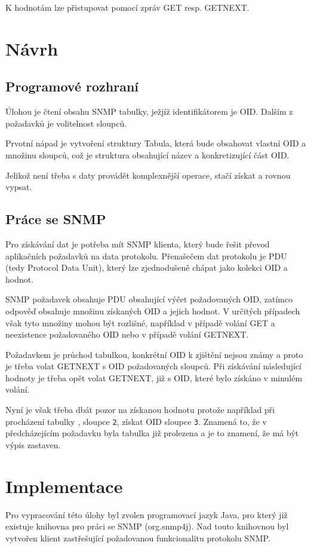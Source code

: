 \documentclass[12pt,a4paper]{article}
\let\oldsection\section
\renewcommand\section{\clearpage\oldsection}
\begin{document}
K hodnotám lze přistupovat pomocí zpráv GET resp. GETNEXT.

\section{Návrh}
\subsection{Programové rozhraní}
Úlohou je čtení obsahu SNMP tabulky, ježjíž identifikátorem je OID. Dalším z požadavků je volitelnost sloupců.

Prvotní nápad je vytvoření struktury Tabula, která bude obsahovat vlastní OID a množinu sloupců, což je struktura obsahující název a konkretizující část OID.

Jelikož není třeba s daty provádět komplexnější operace, stačí získat a rovnou vypsat.

\subsection{Práce se SNMP}
Pro získávání dat je potřeba mít SNMP klienta, který bude řešit převod aplikačních požadavků na data protokolu.
Přenašečem dat protokolu je PDU (tedy Protocol Data Unit), který lze zjednodušeně chápat jako kolekci OID a hodnot.

SNMP požadavek obsahuje PDU obsahující výčet požadovaných OID, zatímco odpověď obsahuje množinu získaných OID a jejich hodnot.
V určitých případech však tyto množiny mohou být rozlišné, například v případě volání GET a neexistence požadovaného OID nebo v případě volání GETNEXT.

Požadavkem je průchod tabulkou, konkrétní OID k zjištění nejsou známy a proto je třeba volat GETNEXT s OID požadovaných sloupců.
Při získávání následující hodnoty je třeba opět volat GETNEXT, již s OID, které bylo získáno v minulém volání.

Nyní je však třeba dbát pozor na získanou hodnotu protože například při procházení tabulky , sloupce \texttt{2}, získat OID sloupce \texttt{3}.
Znamená to, že v předcházejícím požadavku byla tabulka již prolezena a je to znamení, že má být výpis zastaven.

\section{Implementace}
Pro vypracování této úlohy byl zvolen programovací jazyk Java, pro který již existuje knihovna pro práci se SNMP (org.snmp4j).
Nad touto knihovnou byl vytvořen klient zastřešující požadovanou funkcionalitu protokolu SNMP.
\end{document}
